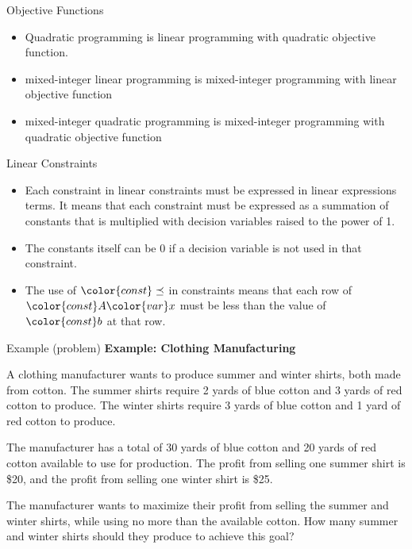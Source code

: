 \documentclass{beamer}
\begin{document}
\begin{frame}{Objective Functions}

    \begin{itemize}
        \item \textcolor{obj}{Quadratic} programming is \textcolor{obj}{linear} programming with \textcolor{obj}{quadratic objective function}.
        \item \textcolor{var}{mixed-integer} \textcolor{obj}{linear} programming is \textcolor{var}{mixed-integer} programming with \textcolor{obj}{linear objective function}
        \item \textcolor{var}{mixed-integer} \textcolor{obj}{quadratic} programming is \textcolor{var}{mixed-integer} programming with \textcolor{obj}{quadratic objective function}
    \end{itemize}

\end{frame}

\begin{frame}{Linear Constraints}

    \begin{itemize}
        \item Each \textcolor{const}{constraint} in \textcolor{const}{linear constraints} must be expressed in linear expressions terms. It means that each \textcolor{const}{constraint} must be expressed as a summation of \textcolor{const}{constants} that is multiplied with \textcolor{var}{decision variables} raised to the power of 1.
        \item The \textcolor{const}{constants} itself can be $0$ if a \textcolor{var}{decision variable} is not used in that \textcolor{const}{constraint}.
        \item The use of $\color{const} \preceq$ in \textcolor{const}{constraints} means that each row of $\color{const} A \color{var} x$ must be less than the value of $\color{const} b$ at that row.
    \end{itemize}

\end{frame}

\begin{frame}{Example (problem)}
    \textbf{Example: Clothing Manufacturing}

    A clothing manufacturer wants to produce summer and winter shirts, both made from cotton. The summer shirts require 2 yards of blue cotton and 3 yards of red cotton to produce. The winter shirts require 3 yards of blue cotton and 1 yard of red cotton to produce.

    The manufacturer has a total of 30 yards of blue cotton and 20 yards of red cotton available to use for production. The profit from selling one summer shirt is \$20, and the profit from selling one winter shirt is \$25.

    The manufacturer wants to maximize their profit from selling the summer and winter shirts, while using no more than the available cotton. How many summer and winter shirts should they produce to achieve this goal?
\end{frame}
\end{document}
